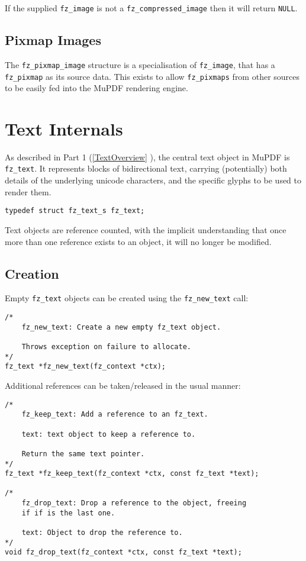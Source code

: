 \documentclass[oneside]{book}
\newcommand{\rjwref}[1] {\autoref{#1} \nameref{#1}}
\begin{document}
If the supplied \texttt{fz\_image} is not a \texttt{fz\_compressed\_image} then it will return \texttt{NULL}.

\section{Pixmap Images}

The \texttt{fz\_pixmap\_image} structure is a specialisation of \texttt{fz\_image}, that has a \texttt{fz\_pixmap} as its source data. This exists to allow \texttt{fz\_pixmaps} from other sources to be easily fed into the MuPDF rendering engine.

\chapter{Text Internals}
\label{Text}

As described in Part 1 (\rjwref{TextOverview}), the central text object in MuPDF is \texttt{fz\_text}. It represents blocks of bidirectional text, carrying (potentially) both details of the underlying unicode characters, and the specific glyphs to be used to render them.

\begin{lstlisting}
typedef struct fz_text_s fz_text;
\end{lstlisting}

Text objects are reference counted, with the implicit understanding that once more than one reference exists to an object, it will no longer be modified.

\section{Creation}
\label{TextCreation}

Empty \texttt{fz\_text} objects can be created using the \texttt{fz\_new\_text} call:

\begin{lstlisting}
/*
	fz_new_text: Create a new empty fz_text object.

	Throws exception on failure to allocate.
*/
fz_text *fz_new_text(fz_context *ctx);
\end{lstlisting}

Additional references can be taken/released in the usual manner:

\begin{lstlisting}
/*
	fz_keep_text: Add a reference to an fz_text.

	text: text object to keep a reference to.

	Return the same text pointer.
*/
fz_text *fz_keep_text(fz_context *ctx, const fz_text *text);

/*
	fz_drop_text: Drop a reference to the object, freeing
	if if is the last one.

	text: Object to drop the reference to.
*/
void fz_drop_text(fz_context *ctx, const fz_text *text);
\end{lstlisting}
\end{document}
